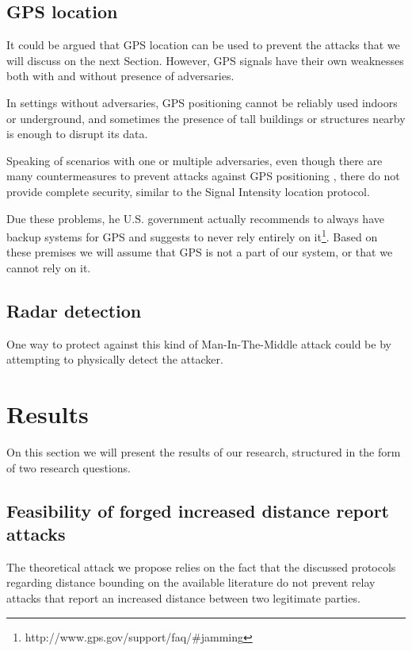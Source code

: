 \documentclass{article}
\begin{document}
\subsection{GPS location}

It could be argued that GPS location can be used to prevent the attacks that we will discuss on the next Section. However, GPS signals have their own weaknesses both with and without presence of adversaries.

In settings without adversaries, GPS positioning cannot be reliably used indoors or underground, and sometimes the presence of tall buildings or structures nearby is enough to disrupt its data.

Speaking of scenarios with one or multiple adversaries, even though there are many countermeasures to prevent attacks against GPS positioning \cite{warner2003gps, wen2005countermeasures, jafarnia2012gps}, there do not provide complete security, similar to the Signal Intensity location protocol.

Due these problems, he U.S. government actually recommends to always have backup systems for GPS and suggests to never rely entirely on it\footnote{http://www.gps.gov/support/faq/\#jamming}. Based on these premises we will assume that GPS is not a part of our system, or that we cannot rely on it.

\subsection{Radar detection}

One way to protect against this kind of Man-In-The-Middle attack could be by attempting to physically detect the attacker.

\section{Results}

On this section we will present the results of our research, structured in the form of two research questions.

\subsection{Feasibility of forged increased distance report attacks}

The theoretical attack we propose relies on the fact that the discussed protocols regarding distance bounding on the available literature do not prevent relay attacks that report an increased distance between two legitimate parties.
\end{document}
